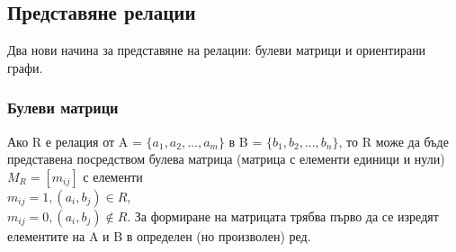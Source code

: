 \documentclass[fleqn, 12pt]{article}
\begin{document}
\subsection{Представяне релации}
Два нови начина за представяне на релации: булеви матрици и ориентирани графи.

\subsubsection{Булеви матрици}
Ако R е релация от A = $\{a_1, a_2, ..., a_m\}$ в B = $\{b_1, b_2, ..., b_n\}$, то R може да бъде представена посредством булева матрица (матрица с елементи единици и нули)\\
$M_R= [m_{ij}]$ с елементи \\
$m_{ij}= 1, (a_i, b_j) \in R$, \\
$m_{ij}= 0, (a_i, b_j) \notin R$.
За формиране на матрицата трябва първо да се изредят елементите на A и B в определен (но произволен) ред.
\end{document}
